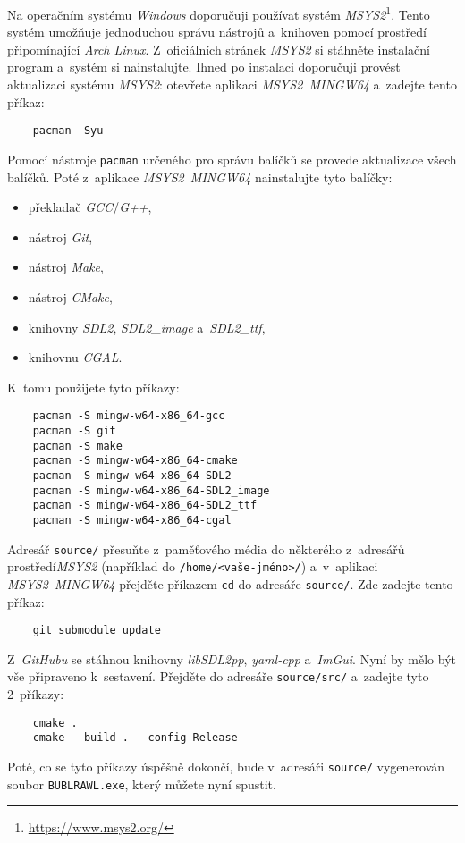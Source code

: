 Na operačním systému \emph{Windows} doporučuji používat systém \emph{MSYS2}\footnote{\url{https://www.msys2.org/}}. Tento systém umožňuje jednoduchou správu nástrojů a~knihoven pomocí prostředí připomínající \emph{Arch Linux}. Z~oficiálních stránek \emph{MSYS2} si stáhněte instalační program a~systém si nainstalujte. Ihned po instalaci doporučuji provést aktualizaci systému \emph{MSYS2}: otevřete aplikaci \emph{MSYS2~MINGW64} a~zadejte tento příkaz:
\begin{verbatim}
    pacman -Syu
\end{verbatim}
Pomocí nástroje \texttt{pacman} určeného pro správu balíčků se provede aktualizace všech balíčků. Poté z~aplikace \emph{MSYS2~MINGW64} nainstalujte tyto balíčky:
\begin{itemize}
    \item překladač \emph{GCC}/\emph{G++},
    \item nástroj \emph{Git},
    \item nástroj \emph{Make},
    \item nástroj \emph{CMake},
    \item knihovny \emph{SDL2}, \emph{SDL2\_image} a~\emph{SDL2\_ttf},
    \item knihovnu \emph{CGAL}.
\end{itemize}
K~tomu použijete tyto příkazy:
\begin{verbatim}
    pacman -S mingw-w64-x86_64-gcc
    pacman -S git
    pacman -S make
    pacman -S mingw-w64-x86_64-cmake
    pacman -S mingw-w64-x86_64-SDL2
    pacman -S mingw-w64-x86_64-SDL2_image
    pacman -S mingw-w64-x86_64-SDL2_ttf
    pacman -S mingw-w64-x86_64-cgal
\end{verbatim}

Adresář \texttt{source/} přesuňte z~paměťového média do některého z~adresářů prostředí\linebreak \emph{MSYS2} (například do \verb|/home/<vaše-jméno>/|) a~v~aplikaci \emph{MSYS2~MINGW64} přejděte příkazem \texttt{cd} do adresáře \texttt{source/}. Zde zadejte tento příkaz:
\begin{verbatim}
    git submodule update
\end{verbatim}
Z~\emph{GitHubu} se stáhnou knihovny \emph{libSDL2pp}, \emph{yaml-cpp} a~\emph{ImGui}. Nyní by mělo být vše připraveno k~sestavení. Přejděte do adresáře \texttt{source/src/} a~zadejte tyto 2~příkazy:
\begin{verbatim}
    cmake .
    cmake --build . --config Release
\end{verbatim}
Poté, co se tyto příkazy úspěšně dokončí, bude v~adresáři \texttt{source/} vygenerován soubor \texttt{BUBLRAWL.exe}, který můžete nyní spustit.


